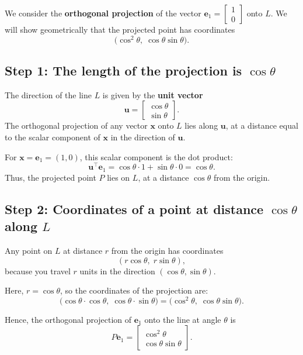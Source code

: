  
We consider the \textbf{orthogonal projection} of the vector \( \mathbf{e}_1 = \begin{bmatrix} 1 \\ 0 \end{bmatrix} \) onto \( L \).  
We will show geometrically that the projected point has coordinates
\[
\bigl( \cos^2\theta,\; \cos\theta \sin\theta \bigr).
\]

\subsection*{Step 1: The length of the projection is \( \cos\theta \)}

The direction of the line \( L \) is given by the \textbf{unit vector}
\[
\mathbf{u} = \begin{bmatrix} \cos\theta \\ \sin\theta \end{bmatrix}.
\]
The orthogonal projection of any vector \( \mathbf{x} \) onto \( L \) lies along \( \mathbf{u} \), at a distance equal to the scalar component of \( \mathbf{x} \) in the direction of \( \mathbf{u} \).

For \( \mathbf{x} = \mathbf{e}_1 = (1, 0) \), this scalar component is the dot product:
\[
\mathbf{u}^\top \mathbf{e}_1 = \cos\theta \cdot 1 + \sin\theta \cdot 0 = \cos\theta.
\]
Thus, the projected point \( P \) lies on \( L \), at a distance \( \cos\theta \) from the origin.

\subsection*{Step 2: Coordinates of a point at distance \( \cos\theta \) along \( L \)}

Any point on \( L \) at distance \( r \) from the origin has coordinates
\[
(r \cos\theta,\; r \sin\theta),
\]
because you travel \( r \) units in the direction \( (\cos\theta, \sin\theta) \).

Here, \( r = \cos\theta \), so the coordinates of the projection are:
\[
\bigl( \cos\theta \cdot \cos\theta,\; \cos\theta \cdot \sin\theta \bigr)
= \bigl( \cos^2\theta,\; \cos\theta \sin\theta \bigr).
\]

Hence, the orthogonal projection of \( \mathbf{e}_1 \) onto the line at angle \( \theta \) is
\[
P\mathbf{e}_1 = 
\begin{bmatrix}
\cos^2\theta \\
\cos\theta \sin\theta
\end{bmatrix}.
\]

